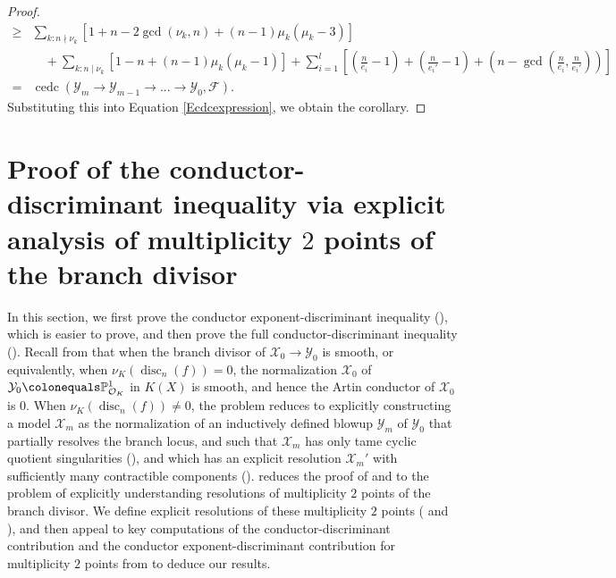 \documentclass[12pt]{amsart}
\numberwithin{equation}{section}
\theoremstyle{definition}
\newcommand{\mc}[1]{\mathcal{#1}}
\renewcommand{\P}{\mathbb P}
\newcommand{\F}{\mathcal{F}}
\newcommand{\X}{\mathcal{X}}
\newcommand{\Y}{\mathcal{Y}}
\DeclareMathOperator{\disc}{disc}
\DeclareMathOperator{\cedc}{cedc}
\begin{document}
\begin{proof}
\begin{align*}
        \geq& \sum_{k:n\nmid\nu_k}[1+n-2\gcd(\nu_k,n)+(n-1)\mu_k(\mu_k-3)]\\
        &\quad+\sum_{k:n\mid\nu_k} [1-n+(n-1)\mu_k(\mu_k-1)]+\sum_{i=1}^l \left[ \left(\frac{n}{e_i}-1 \right)+\left(\frac{n}{e_i'}-1 \right)+\left(n-\gcd \left(\frac{n}{e_i},\frac{n}{e_i'} \right) \right) \right]\\
        =& \cedc(\Y_m\to\Y_{m-1}\to...\to\Y_0,\F).
    \end{align*}
     Substituting this into Equation \eqref{Ecdcexpression}, we obtain the corollary.
\end{proof}

\section{Proof of the conductor-discriminant inequality via explicit analysis of multiplicity $2$ points of the branch divisor}\label{Scontribution}

In this section, we first prove the conductor exponent-discriminant inequality (), which is easier to prove, and then prove the full conductor-discriminant inequality (). Recall from  that when the branch divisor of $\mc{X}_0 \rightarrow \mc{Y}_0$ is smooth, or equivalently, when $\nu_K(\disc_n(f)) = 0$, the normalization $\mc{X}_0$ of $\mc{Y}_0 \colonequals \P^1_{\mc{O}_K}$ in $K(X)$ is smooth, and hence the Artin conductor of $\mc{X}_0$ is $0$. When $\nu_K(\disc_n(f)) \neq 0$, the problem reduces to explicitly constructing a model $\mc{X}_m$ as the normalization of an inductively defined blowup $\mc{Y}_m$ of $\mc{Y}_0$ that partially resolves the branch locus, and such that $\X_m$ has only tame cyclic quotient singularities (), and which has an explicit resolution $\mc{X}_m'$ with sufficiently many contractible components (). 
 reduces the proof of  and  to the problem of explicitly understanding resolutions of multiplicity $2$ points of the branch divisor. We define explicit resolutions of these multiplicity $2$ points ( and ), and then appeal to key computations of the conductor-discriminant contribution and the conductor exponent-discriminant contribution for multiplicity $2$ points from \cite[Theorems~1.6,1.7]{Part2} to deduce our results.  
\end{document}
